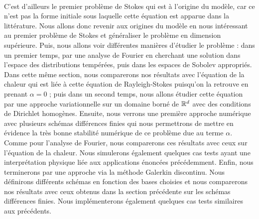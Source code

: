 \\
C'est d'ailleurs le premier problème de Stokes qui est à l'origine du modèle, car ce n'est pas la forme initiale sous laquelle cette équation est apparue dans la littérature. Nous allons donc revenir aux origines du modèle en nous intéressant au premier problème de Stokes et généraliser le problème en dimension supérieure. Puis, nous allons voir différentes manières d'étudier le problème : dans un premier temps, par une analyse de Fourier en cherchant une solution dans l'espace des distributions tempérées, puis dans les espaces de Sobolev appropriés. Dans cette même section, nous comparerons nos résultats avec l'équation de la chaleur qui est liée à cette équation de Rayleigh-Stokes puisqu'on la retrouve en prenant $\alpha =0$ ; puis dans un second temps, nous allons étudier cette équation par une approche variationnelle sur un domaine borné de $\mathbb{R}^d$ avec des conditions de Dirichlet homogènes. Ensuite, nous verrons une première approche numérique avec plusieurs schémas différences finies qui nous permettrons de mettre en évidence la très bonne stabilité numérique de ce problème due au terme $\alpha$. Comme pour l'analyse de Fourier, nous comparerons ces résultats avec ceux sur l'équation de la chaleur. Nous simulerons également quelques cas tests ayant une interprétation physique liée aux applications énoncées précédemment. Enfin, nous terminerons par une approche via la méthode Galerkin discontinu. Nous définirons différents schémas en fonction des bases choisies et nous comparerons nos résultats avec ceux obtenus dans la section précédente sur les schémas différences finies. Nous implémenterons également quelques cas tests similaires aux précédents.